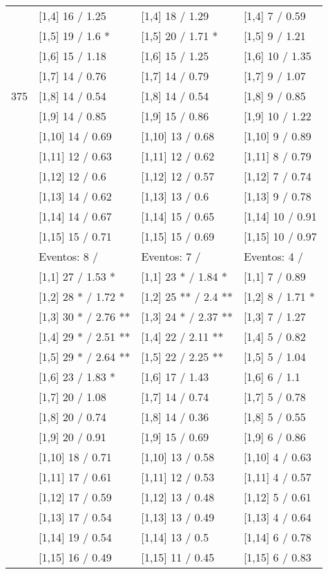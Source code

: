 \begin{table}
\begin{tabular}[t]{llll}
 & {}[1,4] 16  / 1.25 & {}[1,4] 18  / 1.29 & {}[1,4] 7  / 0.59\\
 & {}[1,5] 19  / 1.6 * & {}[1,5] 20  / 1.71 * & {}[1,5] 9  / 1.21\\
 & {}[1,6] 15  / 1.18 & {}[1,6] 15  / 1.25 & {}[1,6] 10  / 1.35\\
 & {}[1,7] 14  / 0.76 & {}[1,7] 14  / 0.79 & {}[1,7] 9  / 1.07\\
375 & {}[1,8] 14  / 0.54 & {}[1,8] 14  / 0.54 & {}[1,8] 9  / 0.85\\
\addlinespace
 & {}[1,9] 14  / 0.85 & {}[1,9] 15  / 0.86 & {}[1,9] 10  / 1.22\\
 & {}[1,10] 14  / 0.69 & {}[1,10] 13  / 0.68 & {}[1,10] 9  / 0.89\\
 & {}[1,11] 12  / 0.63 & {}[1,11] 12  / 0.62 & {}[1,11] 8  / 0.79\\
 & {}[1,12] 12  / 0.6 & {}[1,12] 12  / 0.57 & {}[1,12] 7  / 0.74\\
 & {}[1,13] 14  / 0.62 & {}[1,13] 13  / 0.6 & {}[1,13] 9  / 0.78\\
\addlinespace
 & {}[1,14] 14  / 0.67 & {}[1,14] 15  / 0.65 & {}[1,14] 10  / 0.91\\
 & {}[1,15] 15  / 0.71 & {}[1,15] 15  / 0.69 & {}[1,15] 10  / 0.97\\
 & Eventos:  8 / & Eventos:  7 / & Eventos:  4 /\\
 & {}[1,1] 27  / 1.53 * & {}[1,1] 23 * / 1.84 * & {}[1,1] 7  / 0.89\\
 & {}[1,2] 28 * / 1.72 * & {}[1,2] 25 ** / 2.4 ** & {}[1,2] 8  / 1.71 *\\
\addlinespace
 & {}[1,3] 30 * / 2.76 ** & {}[1,3] 24 * / 2.37 ** & {}[1,3] 7  / 1.27\\
 & {}[1,4] 29 * / 2.51 ** & {}[1,4] 22  / 2.11 ** & {}[1,4] 5  / 0.82\\
 & {}[1,5] 29 * / 2.64 ** & {}[1,5] 22  / 2.25 ** & {}[1,5] 5  / 1.04\\
 & {}[1,6] 23  / 1.83 * & {}[1,6] 17  / 1.43 & {}[1,6] 6  / 1.1\\
 & {}[1,7] 20  / 1.08 & {}[1,7] 14  / 0.74 & {}[1,7] 5  / 0.78\\
\addlinespace
500 & {}[1,8] 20  / 0.74 & {}[1,8] 14  / 0.36 & {}[1,8] 5  / 0.55\\
 & {}[1,9] 20  / 0.91 & {}[1,9] 15  / 0.69 & {}[1,9] 6  / 0.86\\
 & {}[1,10] 18  / 0.71 & {}[1,10] 13  / 0.58 & {}[1,10] 4  / 0.63\\
 & {}[1,11] 17  / 0.61 & {}[1,11] 12  / 0.53 & {}[1,11] 4  / 0.57\\
 & {}[1,12] 17  / 0.59 & {}[1,12] 13  / 0.48 & {}[1,12] 5  / 0.61\\
\addlinespace
 & {}[1,13] 17  / 0.54 & {}[1,13] 13  / 0.49 & {}[1,13] 4  / 0.64\\
 & {}[1,14] 19  / 0.54 & {}[1,14] 13  / 0.5 & {}[1,14] 6  / 0.78\\
 & {}[1,15] 16  / 0.49 & {}[1,15] 11  / 0.45 & {}[1,15] 6  / 0.83\\
\bottomrule
\end{tabular}
\end{table}
